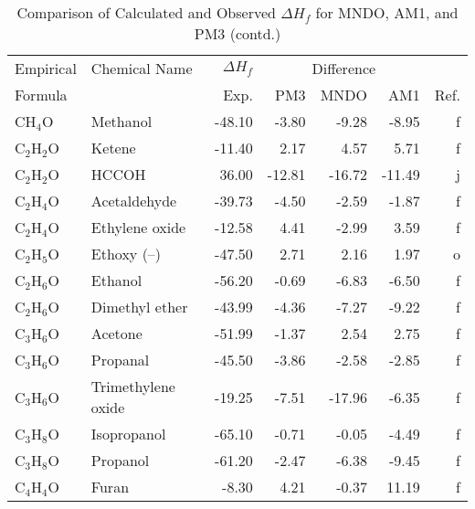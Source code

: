 \begin{table}
\caption{Comparison of Calculated and Observed $\Delta H_f$ 
for MNDO, AM1, and PM3 (contd.)}
\begin{center}
\compresstable
\begin{tabular}{llrrrrr}
Empirical & Chemical Name & $\Delta H_f$ & \multicolumn{3}{c}{Difference} & \\
Formula   &               & Exp. & PM3 &  MNDO  &  AM1 &     Ref.\\
\hline
 CH$_4$O        & Methanol                        &   -48.10    &    -3.80  &    -9.28  &    -8.95  &      f\\
 C$_2$H$_2$O       & Ketene                          &   -11.40    &     2.17  &     4.57  &     5.71  &      f\\
 C$_2$H$_2$O       & HCCOH                           &    36.00    &   -12.81  &   -16.72  &   -11.49  &      j\\
 C$_2$H$_4$O       & Acetaldehyde                    &   -39.73    &    -4.50  &    -2.59  &    -1.87  &      f\\
 C$_2$H$_4$O       & Ethylene oxide                  &   -12.58    &     4.41  &    -2.99  &     3.59  &      f\\
 C$_2$H$_5$O       & Ethoxy (--)                      &   -47.50    &     2.71  &     2.16  &     1.97  &      o\\
 C$_2$H$_6$O       & Ethanol                         &   -56.20    &    -0.69  &    -6.83  &    -6.50  &      f\\
 C$_2$H$_6$O       & Dimethyl ether                  &   -43.99    &    -4.36  &    -7.27  &    -9.22  &      f\\
 C$_3$H$_6$O       & Acetone                         &   -51.99    &    -1.37  &     2.54  &     2.75  &      f\\
 C$_3$H$_6$O       & Propanal                        &   -45.50    &    -3.86  &    -2.58  &    -2.85  &      f\\
 C$_3$H$_6$O       & Trimethylene oxide              &   -19.25    &    -7.51  &   -17.96  &    -6.35  &      f\\
 C$_3$H$_8$O       & Isopropanol                     &   -65.10    &    -0.71  &    -0.05  &    -4.49  &      f\\
 C$_3$H$_8$O       & Propanol                        &   -61.20    &    -2.47  &    -6.38  &    -9.45  &      f\\
 C$_4$H$_4$O       & Furan                           &    -8.30    &     4.21  &    -0.37  &    11.19  &      f\\

\end{tabular}
\end{center}
\end{table}
